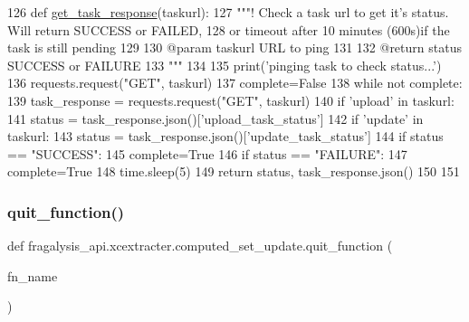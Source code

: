 \begin{DoxyCode}
126 \textcolor{keyword}{def }\hyperlink{namespacefragalysis__api_1_1xcextracter_1_1computed__set__update_a5065036bae4e3eea5df321d366767d29}{get\_task\_response}(taskurl):
127     \textcolor{stringliteral}{"""! Check a task url to get it's status. Will return SUCCESS or FAILED,}
128 \textcolor{stringliteral}{        or timeout after 10 minutes (600s)if the task is still pending}
129 \textcolor{stringliteral}{    }
130 \textcolor{stringliteral}{        @param taskurl URL to ping}
131 \textcolor{stringliteral}{        }
132 \textcolor{stringliteral}{        @return status SUCCESS or FAILURE}
133 \textcolor{stringliteral}{        """}
134         
135     print(\textcolor{stringliteral}{'pinging task to check status...'})
136     requests.request(\textcolor{stringliteral}{"GET"}, taskurl)
137     complete=\textcolor{keyword}{False}
138     \textcolor{keywordflow}{while} \textcolor{keywordflow}{not} complete:
139         task\_response = requests.request(\textcolor{stringliteral}{"GET"}, taskurl)
140         \textcolor{keywordflow}{if} \textcolor{stringliteral}{'upload'} \textcolor{keywordflow}{in} taskurl:
141             status = task\_response.json()[\textcolor{stringliteral}{'upload\_task\_status'}]
142         \textcolor{keywordflow}{if} \textcolor{stringliteral}{'update'} \textcolor{keywordflow}{in} taskurl:
143             status = task\_response.json()[\textcolor{stringliteral}{'update\_task\_status'}]
144         \textcolor{keywordflow}{if} status == \textcolor{stringliteral}{"SUCCESS"}:
145             complete=\textcolor{keyword}{True}
146         \textcolor{keywordflow}{if} status == \textcolor{stringliteral}{"FAILURE"}:
147             complete=\textcolor{keyword}{True}
148         time.sleep(5)
149     \textcolor{keywordflow}{return} status, task\_response.json()
150 
151 \end{DoxyCode}
\mbox{\label{namespacefragalysis__api_1_1xcextracter_1_1computed__set__update_a9a7a1666e3c737a48bc3ebfe981adeef}} 
\subsubsection{\texorpdfstring{quit\+\_\+function()}{quit\_function()}}
{\footnotesize\ttfamily def fragalysis\+\_\+api.\+xcextracter.\+computed\+\_\+set\+\_\+update.\+quit\+\_\+function (\begin{DoxyParamCaption}\item[{}]{fn\+\_\+name }\end{DoxyParamCaption})}




